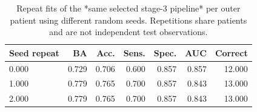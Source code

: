 \begin{table}[t]
\centering
\caption{Repeat fits of the *same selected stage-3 pipeline* per outer patient using different random seeds. Repetitions share patients and are not independent test observations.}
\label{tab:final_seed_robustness}
\footnotesize
\setlength{\tabcolsep}{4pt}
\begin{tabular}{lrrrrrr}
\toprule
Seed repeat & BA & Acc. & Sens. & Spec. & AUC & Correct \\
\midrule
0.000 & 0.729 & 0.706 & 0.600 & 0.857 & 0.857 & 12.000 \\
1.000 & 0.779 & 0.765 & 0.700 & 0.857 & 0.843 & 13.000 \\
2.000 & 0.779 & 0.765 & 0.700 & 0.857 & 0.843 & 13.000 \\
\bottomrule
\end{tabular}
\end{table}
